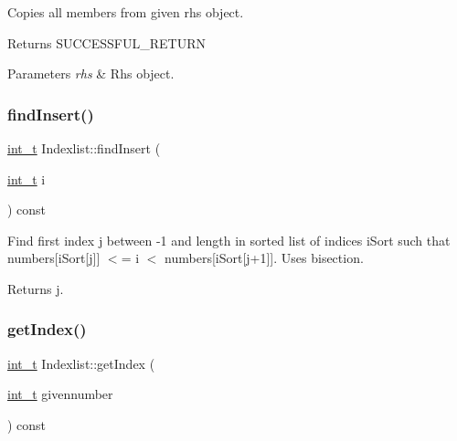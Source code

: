 Copies all members from given rhs object. \begin{DoxyReturn}{Returns}
S\+U\+C\+C\+E\+S\+S\+F\+U\+L\+\_\+\+R\+E\+T\+U\+RN 
\end{DoxyReturn}

\begin{DoxyParams}{Parameters}
{\em rhs} & Rhs object. \\
\hline
\end{DoxyParams}
\mbox{\label{class_indexlist_a32388283a23256266616946d3c683ec7}} 
\subsubsection{\texorpdfstring{find\+Insert()}{findInsert()}}
{\footnotesize\ttfamily \hyperlink{_types_8hpp_ab6fd6105e64ed14a0c9281326f05e623}{int\+\_\+t} Indexlist\+::find\+Insert (\begin{DoxyParamCaption}\item[{\hyperlink{_types_8hpp_ab6fd6105e64ed14a0c9281326f05e623}{int\+\_\+t}}]{i }\end{DoxyParamCaption}) const\hspace{0.3cm}{\ttfamily [protected]}}

Find first index j between -\/1 and length in sorted list of indices i\+Sort such that numbers\mbox{[}i\+Sort\mbox{[}j\mbox{]}\mbox{]} $<$= i $<$ numbers\mbox{[}i\+Sort\mbox{[}j+1\mbox{]}\mbox{]}. Uses bisection. \begin{DoxyReturn}{Returns}
j. 
\end{DoxyReturn}
\mbox{\label{class_indexlist_a1534c1bd558955279083bd44ff9cfc91}} 
\subsubsection{\texorpdfstring{get\+Index()}{getIndex()}}
{\footnotesize\ttfamily \hyperlink{_types_8hpp_ab6fd6105e64ed14a0c9281326f05e623}{int\+\_\+t} Indexlist\+::get\+Index (\begin{DoxyParamCaption}\item[{\hyperlink{_types_8hpp_ab6fd6105e64ed14a0c9281326f05e623}{int\+\_\+t}}]{givennumber }\end{DoxyParamCaption}) const}

